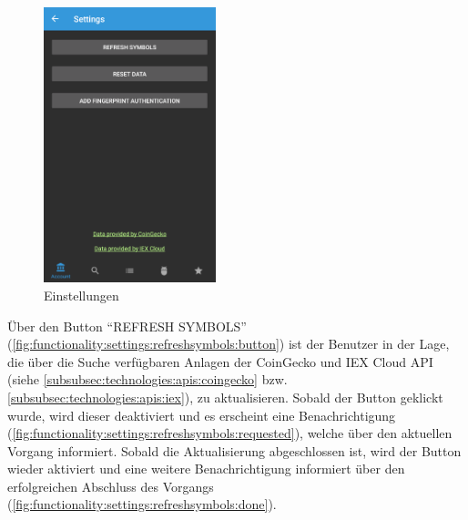 \documentclass[a4paper]{article}
\begin{document}
\begin{figure}[H]
	\centering
	\includegraphics[width=.5\textwidth,height=8cm,keepaspectratio]{./images/settings/raw.png}
	\caption{Einstellungen}
	\label{fig:functionality:settings}
\end{figure}


Über den Button "`REFRESH SYMBOLS"' (\autoref{fig:functionality:settings:refreshsymbols:button}) ist der Benutzer in der Lage, die über die Suche verfügbaren Anlagen der CoinGecko und IEX Cloud API (siehe \autoref{subsubsec:technologies:apis:coingecko} bzw. \autoref{subsubsec:technologies:apis:iex}), zu aktualisieren. Sobald der Button geklickt wurde, wird dieser deaktiviert und es erscheint eine Benachrichtigung (\autoref{fig:functionality:settings:refreshsymbols:requested}), welche über den aktuellen Vorgang informiert. Sobald die Aktualisierung abgeschlossen ist, wird der Button wieder aktiviert und eine weitere Benachrichtigung informiert über den erfolgreichen Abschluss des Vorgangs (\autoref{fig:functionality:settings:refreshsymbols:done}).
\end{document}
